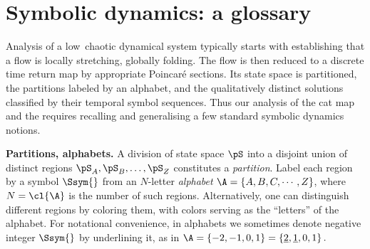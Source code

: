\renewcommand{\shift}{\ensuremath{d}}
\renewcommand{\Xx}{\ensuremath{\mathsf{X}}}



\section{Symbolic dynamics: a glossary}
\label{s-SymbDynGloss}

\renewcommand{\statesp}{state space}
\renewcommand{\Statesp}{State space}
\renewcommand{\stateDsp}{state-space}
\renewcommand{\StateDsp}{State-space}

Analysis of a low\dmn\ chaotic dynamical system typically
starts with establishing that a flow is locally stretching, globally
folding. The flow is then reduced to a discrete time return map by appropriate
Poincar\'e sections. Its state space is partitioned, the partitions labeled by an
alphabet, and the qualitatively distinct solutions classified by their temporal
symbol sequences. Thus our analysis of the cat map and the {\catlatt} requires
recalling and generalising a few standard symbolic dynamics notions.

{\bf Partitions, alphabets.}
A division of {\statesp} $\pS$ into a disjoint union of distinct regions
$\pS_A,\pS_B,\ldots,\pS_Z$ constitutes a {\em
partition}. Label each region by a symbol $\Ssym{}$ from an
$N$-letter  {\em alphabet}
$\A=\{A,B,C,\cdots,Z\}$, where $N=\cl{\A}$ is
the number of such regions. Alternatively, one can distinguish different
regions by coloring them, with colors serving as the ``letters'' of the
alphabet.
For notational convenience, in alphabets we sometimes denote negative integer
$\Ssym{}$ by underlining it, as in
\(
\A = \{ -{2}, -{1}, 0, 1\}
   = \{ \underline{2}, \underline{1}, 0, 1\}
\,.
\)


